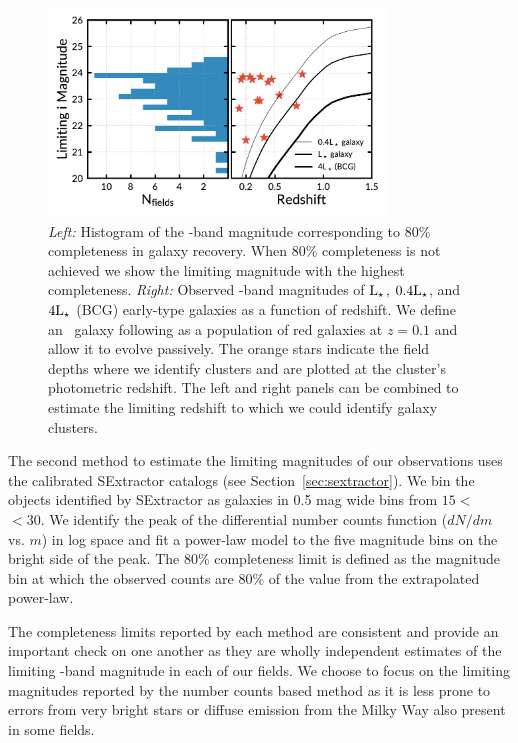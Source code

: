 \documentclass[apj, revtex4-1]{emulateapj}
\begin{document}
\begin{figure}
	\centering
	\includegraphics[width=0.8\textwidth]{recovery_redshift.pdf}
	\caption{\textit{Left:} Histogram of the \sdssi-band magnitude corresponding to 80\% completeness in galaxy recovery. When 80\% completeness is not achieved we show the limiting magnitude with the highest completeness. \textit{Right:} Observed \sdssi-band magnitudes of $\hbox{L$_{\star}$}$, $0.4\hbox{L$_{\star}$}$, and $4\hbox{L$_{\star}$}$ (BCG) early-type galaxies as a function of redshift. We define an \lstar\ galaxy following \cite{Blanton2003} as a population of red galaxies at $z = 0.1$ and allow it to evolve passively. The orange stars indicate the field depths where we identify clusters and are plotted at the cluster's photometric redshift. The left and right panels can be combined to estimate the limiting redshift to which we could identify galaxy clusters.}
	\label{fig:recovery_redshift}
\end{figure}

The second method to estimate the limiting magnitudes of our observations uses the calibrated SExtractor catalogs (see Section~\ref{sec:sextractor}). We bin the objects identified by SExtractor as galaxies in 0.5 mag wide bins from $15<$ \sdssi\ $<30$. We identify the peak of the differential number counts function ($dN/dm$ vs. $m$) in log space and fit a power-law model to the five magnitude bins on the bright side of the peak. The 80\% completeness limit is defined as the magnitude bin at which the observed counts are 80\% of the value from the extrapolated power-law.

The completeness limits reported by each method are consistent and provide an important check on one another as they are wholly independent estimates of the limiting \sdssi-band magnitude in each of our fields. We choose to focus on the limiting magnitudes reported by the number counts based method as it is less prone to errors from very bright stars or diffuse emission from the Milky Way also present in some fields.
\end{document}
